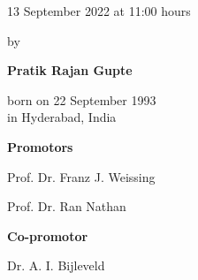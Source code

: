 \begin{titlepage}
\begin{addmargin}[-1cm]{-3cm}
\begin{center}
{            \vspace{3mm}

            13 September 2022 at 11:00 hours

            \vspace{10mm}

            by

            \vspace{10mm}

            \textbf{Pratik Rajan Gupte}

            \vspace{3mm}

            born on 22 September 1993\\
            in Hyderabad, India
        }

    \end{center}

    \pagebreak
    \thispagestyle{empty}

    \textbf{Promotors}
    \begin{description}
        \item Prof. Dr. Franz J. Weissing
        \item Prof. Dr. Ran Nathan
    \end{description}

    \vspace{6mm}

    \textbf{Co-promotor}
    \begin{description}
        \item Dr. A. I. Bijleveld
    \end{description}



  \end{addmargin}

\end{titlepage}


    

